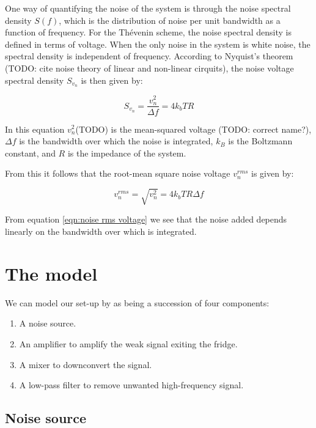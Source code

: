 \documentclass[12pt]{report}
\begin{document}
One way of quantifying the noise of the system is through the noise spectral density $S(f)$, which is the distribution of noise per unit bandwidth as a function of frequency. For the Th\'evenin scheme, the noise spectral density is defined in terms of voltage. When the only noise in the system is white noise, the spectral density is independent of frequency. According to Nyquist's theorem (TODO: cite noise theory of linear and non-linear cirquits), the noise voltage spectral density $S_{v_n}$ is then given by:

\begin{equation}
    S_{v_n} = \frac{{v_n^2}}{\Delta f} = 4 k_b T R
    \label{eqn:noise spectral density}
\end{equation}

In this equation $v_n^2$(TODO) is the mean-squared voltage (TODO: correct name?), $\Delta f$ is the bandwidth over which the noise is integrated, $k_B$ is the Boltzmann constant, and $R$ is the impedance of the system.

From this it follows that the root-mean square noise voltage $v_n^{rms}$ is given by:

\begin{equation}
    v_n^{rms} = \sqrt{v_n^2} = 4 k_b T R \Delta f
    \label{eqn:noise rms voltage}
\end{equation}

From equation \ref{eqn:noise rms voltage} we see that the noise added depends linearly on the bandwidth over which is integrated.


\section{The model}

We can model our set-up by as being a succession of four components:

\begin{enumerate}
    \item A noise source.
    \item An amplifier to amplify the weak signal exiting the fridge.
    \item A mixer to downconvert the signal.
    \item A low-pass filter to remove unwanted high-frequency signal.
\end{enumerate}

\subsection{Noise source}
\end{document}
